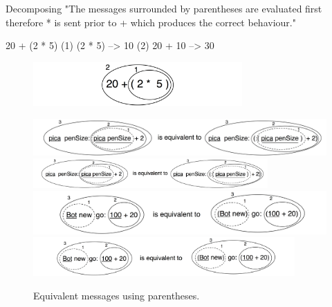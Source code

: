 \documentclass[a4paper,10pt,twoside]{book}
\begin{document}
\begin{example}[mathcorrect]{Decomposing }{}
"The messages surrounded by parentheses are evaluated first therefore * is sent prior to + which produces the correct behaviour."

    20 + (2 * 5) 
(1)        (2 * 5) --> 10
(2) 20 + 10      --> 30
\end{example}

\begin{figure}
\begin{center}
\includegraphics[width=8cm]{ucompoNumberBracket}
\end{center}
\end{figure}



\begin{figure}
\begin{center}
\ifluluelse
	{\includegraphics[width=\textwidth]{uKeyUnBinPar}}
	{\includegraphics[width=0.8\textwidth]{uKeyUnBinPar}}
\ifluluelse
	{\includegraphics[width=\textwidth]{uunKeyBinPar}}
	{\includegraphics[width=10cm]{uunKeyBinPar}}
\end{center}
\caption{Equivalent messages using parentheses. }
\end{figure}
\end{document}
